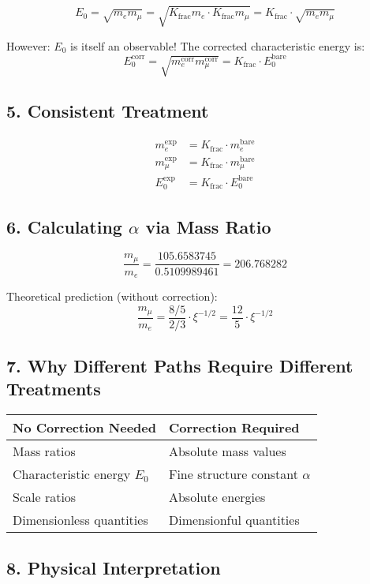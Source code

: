 \documentclass[12pt,a4paper]{article}
\begin{document}
	\[
	E_0 = \sqrt{m_e m_\mu} = \sqrt{K_{\text{frac}} m_e \cdot K_{\text{frac}} m_\mu} = K_{\text{frac}} \cdot \sqrt{m_e m_\mu}
	\]
	
	However: $E_0$ is itself an observable! The corrected characteristic energy is:
	\[
	E_0^{\text{corr}} = \sqrt{m_e^{\text{corr}} m_\mu^{\text{corr}}} = K_{\text{frac}} \cdot E_0^{\text{bare}}
	\]
	
	\subsection*{5. Consistent Treatment}
	
	\begin{align*}
		m_e^{\text{exp}} &= K_{\text{frac}} \cdot m_e^{\text{bare}} \\
		m_\mu^{\text{exp}} &= K_{\text{frac}} \cdot m_\mu^{\text{bare}} \\
		E_0^{\text{exp}} &= K_{\text{frac}} \cdot E_0^{\text{bare}}
	\end{align*}
	
	\subsection*{6. Calculating $\alpha$ via Mass Ratio}
	
	\[
	\frac{m_\mu}{m_e} = \frac{105.6583745}{0.5109989461} = 206.768282
	\]
	
	Theoretical prediction (without correction):
	\[
	\frac{m_\mu}{m_e} = \frac{8/5}{2/3} \cdot \xi^{-1/2} = \frac{12}{5} \cdot \xi^{-1/2}
	\]
	
	\subsection*{7. Why Different Paths Require Different Treatments}
	
	\begin{tabular}{p{}p{}}
		\textbf{No Correction Needed} & \textbf{Correction Required} \\
		\hline
		Mass ratios & Absolute mass values \\
		Characteristic energy $E_0$ & Fine structure constant $\alpha$ \\
		Scale ratios & Absolute energies \\
		Dimensionless quantities & Dimensionful quantities \\
	\end{tabular}
	
	\subsection*{8. Physical Interpretation}
	
\end{document}
